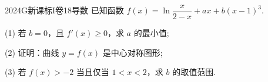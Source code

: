 
\begin{problem}{2024}{G}{新课标I卷}{18}{导数}
已知函数 $f(x)=\ln\dfrac{x}{2-x}+ax+b(x-1)^3$.

(1) 若 $b=0$，且 $f'(x)\geqslant 0$，求 $a$ 的最小值;

(2) 证明：曲线 $y=f(x)$ 是中心对称图形;

(3) 若 $f(x)>-2$ 当且仅当 $1<x<2$，求 $b$ 的取值范围.
\end{problem}